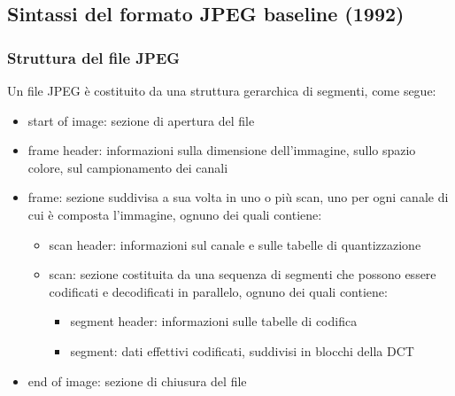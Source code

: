 \newpage

\subsection{Sintassi del formato JPEG baseline (1992)}
\subsubsection*{Struttura del file JPEG}
Un file JPEG è costituito da una struttura gerarchica di segmenti, come segue:
\begin{itemize}
	\item start of image: sezione di apertura del file
	\item frame header: informazioni sulla dimensione dell'immagine, sullo spazio colore, sul campionamento dei canali
	\item frame: sezione suddivisa a sua volta in uno o più scan, uno per ogni canale di cui è composta l'immagine,
	ognuno dei quali contiene:
	\begin{itemize}[topsep=0pt]
		\item scan header: informazioni sul canale e sulle tabelle di quantizzazione
		\item scan: sezione costituita da una sequenza di segmenti che possono essere codificati e decodificati in
		parallelo, ognuno dei quali contiene:
		\begin{itemize}[topsep=0pt]
			\item segment header: informazioni sulle tabelle di codifica
			\item segment: dati effettivi codificati, suddivisi in blocchi della DCT
		\end{itemize}
	\end{itemize}
	\item end of image: sezione di chiusura del file
\end{itemize}

